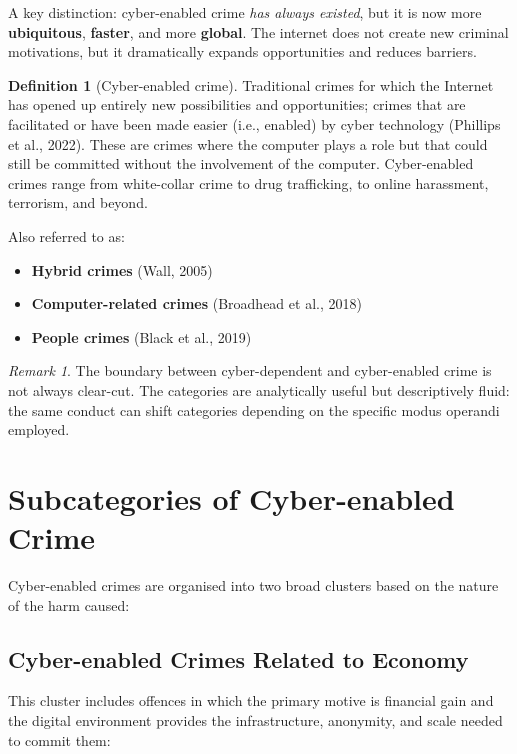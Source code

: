 \documentclass[11pt,a4paper,openany]{report}
\theoremstyle{definition}
\newtheorem{definition}{Definition}[chapter]
\theoremstyle{plain}
\theoremstyle{remark}
\newtheorem*{remark}{Remark}
\begin{document}
A key distinction: cyber-enabled crime \textit{has always existed}, but it is now more \textbf{ubiquitous}, \textbf{faster}, and more \textbf{global}. The internet does not create new criminal motivations, but it dramatically expands opportunities and reduces barriers.

\begin{definition}[Cyber-enabled crime]
Traditional crimes for which the Internet has opened up entirely new possibilities and opportunities; crimes that are facilitated or have been made easier (i.e., enabled) by cyber technology (Phillips et al., 2022). These are crimes where the computer plays a role but that could still be committed without the involvement of the computer. Cyber-enabled crimes range from white-collar crime to drug trafficking, to online harassment, terrorism, and beyond.

Also referred to as:
\begin{itemize}
    \item \textbf{Hybrid crimes} (Wall, 2005)
    \item \textbf{Computer-related crimes} (Broadhead et al., 2018)
    \item \textbf{People crimes} (Black et al., 2019)
\end{itemize}
\end{definition}

\begin{remark}
The boundary between cyber-dependent and cyber-enabled crime is not always clear-cut. The categories are analytically useful but descriptively fluid: the same conduct can shift categories depending on the specific modus operandi employed.
\end{remark}


\section{Subcategories of Cyber-enabled Crime}

Cyber-enabled crimes are organised into two broad clusters based on the nature of the harm caused:

\subsection{Cyber-enabled Crimes Related to Economy}

This cluster includes offences in which the primary motive is financial gain and the digital environment provides the infrastructure, anonymity, and scale needed to commit them:
\end{document}

